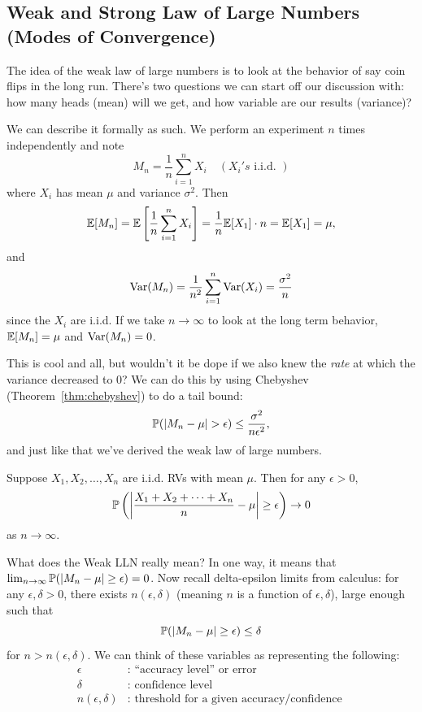 \documentclass[11 pt]{scrartcl}
\begin{document}
\subsection{Weak and Strong Law of Large Numbers (Modes of Convergence)}
The idea of the weak law of large numbers is to look at the behavior of say coin flips in the long run. There's two questions we can start off our discussion with: how many heads (mean) will we get, and how variable are our results (variance)? 

We can describe it formally as such. We perform an experiment $n$ times independently and note 
\[ M_n = \dfrac{1}{n}\sum_{i=1}^n X_i \quad (X_i's \text{ i.i.d. })\] 
where $X_i$ has mean $\mu$ and variance $\sigma^2$. Then 
\[ \mathbb E[M_n] = \mathbb E\left[\dfrac{1}{n}\sum_{i=1}^n X_i\right] = \dfrac{1}{n} \mathbb E[X_1]\cdot n = \mathbb E[X_1] = \mu,\] 
and 
\[ \text{Var}(M_n) = \dfrac{1}{n^2}\sum_{i = 1}^n \text{Var}(X_i) = \dfrac{\sigma^2}{n}\] 
since the $X_i$ are i.i.d. If we take $n\to\infty$ to look at the long term behavior, $\mathbb E[M_n] = \mu$ and $\text{Var}(M_n) = 0$. 

This is cool and all, but wouldn't it be dope if we also knew the \emph{rate} at which the variance decreased to 0? We can do this by using Chebyshev (Theorem~\ref{thm:chebyshev}) to do a tail bound:
    \[ \mathbb P(|M_n-\mu| > \epsilon) \leq \dfrac{\sigma^2}{n\epsilon^2},\]
     and just like that we've derived the weak law of large numbers. 
\begin{theorem}
    Suppose $X_1, X_2, \dots, X_n$ are i.i.d. RVs with mean $\mu$. Then for any $\epsilon > 0$, 
\[ \mathbb P\left(\left|\dfrac{X_1+X_2+\dots + X_n}{n}-\mu\right| \geq \epsilon\right) \to 0 \]
    as $n\to\infty$. 
\end{theorem}

What does the Weak LLN really mean? In one way, it means that $\lim_{n\to\infty}\mathbb P(|M_n-\mu|\geq \epsilon) = 0$. Now recall delta-epsilon limits from calculus: for any $\epsilon, \delta > 0$, there exists $n(\epsilon, \delta)$ (meaning $n$ is a function of $\epsilon,\delta$), large enough such that 
    \[ \mathbb P(|M_n-\mu|\geq\epsilon) \leq \delta\] 
for $n> n(\epsilon, \delta).$ We can think of these variables as representing the following: 
\begin{align*}
    \epsilon &: \text{ ``accuracy level'' or error } \\ 
    \delta &: \text{ confidence level } \\ 
    n(\epsilon, \delta) &: \text{ threshold for a given accuracy/confidence } 
\end{align*}
\end{document}
